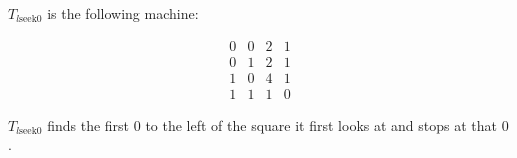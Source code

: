 $T_{l\text{seek}0}$ is the following machine:

$$\begin{array}{cccc}
0 & 0 & 2 & 1 \\
0 & 1 & 2 & 1 \\
1 & 0 & 4 & 1 \\
1 & 1 & 1 & 0
\end{array}$$

$T_{l\text{seek}0}$ finds the first $0$ to the left of the square it first looks at and stops at that $0$.
